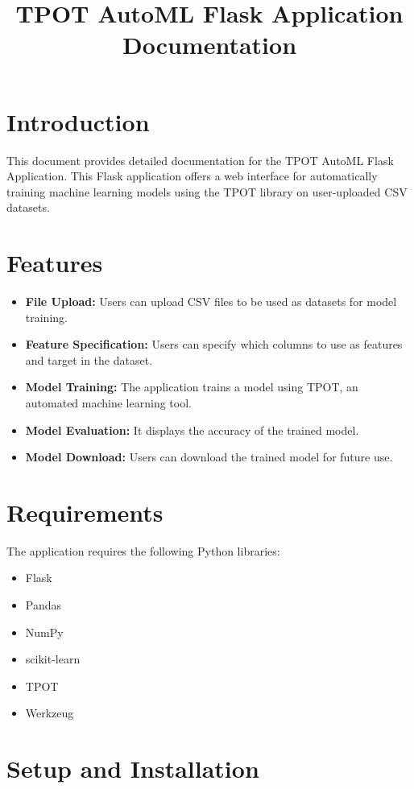 \documentclass{article}
\title{TPOT AutoML Flask Application Documentation}
\author{}
\date{}
\begin{document}
\maketitle

\section{Introduction}
This document provides detailed documentation for the TPOT AutoML Flask Application. This Flask application offers a web interface for automatically training machine learning models using the TPOT library on user-uploaded CSV datasets.

\section{Features}
\begin{itemize}
    \item \textbf{File Upload:} Users can upload CSV files to be used as datasets for model training.
    \item \textbf{Feature Specification:} Users can specify which columns to use as features and target in the dataset.
    \item \textbf{Model Training:} The application trains a model using TPOT, an automated machine learning tool.
    \item \textbf{Model Evaluation:} It displays the accuracy of the trained model.
    \item \textbf{Model Download:} Users can download the trained model for future use.
\end{itemize}

\section{Requirements}
The application requires the following Python libraries:
\begin{itemize}
    \item Flask
    \item Pandas
    \item NumPy
    \item scikit-learn
    \item TPOT
    \item Werkzeug
\end{itemize}

\section{Setup and Installation}
\end{document}
